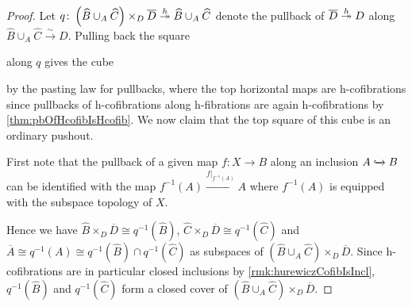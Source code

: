 \begin{prop}
\begin{proof}
        Let $q\colon\left(\widehat{B}\cup_A\widehat{C}\right)\times_{D}\overline{D}\xtwoheadrightarrow{h}\widehat{B}\cup_A\widehat{C}$ denote the pullback of $\overline{D}\xtwoheadrightarrow{h} D$ along $\widehat{B}\cup_A\widehat{C}\xrightarrow{\sim} D$.
        Pulling back the square 
        \begin{center}
        \end{center}
        along $q$ gives the cube
        \begin{center}
        \end{center}
        by the pasting law for pullbacks, where the top horizontal maps are h-cofibrations since pullbacks of h-cofibrations along h-fibrations are again h-cofibrations by \cref{thm:pbOfHcofibIsHcofib}.
        We now claim that the top square of this cube is an ordinary pushout.

        First note that the pullback of a given map $f\colon X\to B$ along an inclusion $A\xhookrightarrow{} B$ can be identified with the map $f^{-1}(A)\xrightarrow{f|_{f^{-1}(A)}}A$ where $f^{-1}(A)$ is equipped with the subspace topology of $X$. 
        
        Hence we have $\widehat{B}\times_{D}\overline{D}\cong q^{-1}(\widehat{B})$, $\widehat{C}\times_{D}\overline{D}\cong q^{-1}(\widehat{C})$ and $\overline{A}\cong q^{-1}(A)\cong q^{-1}(\widehat{B})\cap q^{-1}(\widehat{C})$ as subspaces of $\left(\widehat{B}\cup_A\widehat{C}\right)\times_{D}\overline{D}$.
        Since h-cofibrations are in particular closed inclusions by \cref{rmk:hurewiczCofibIsIncl}, $q^{-1}(\widehat{B})$ and $q^{-1}(\widehat{C})$ form a closed cover of $\left(\widehat{B}\cup_A\widehat{C}\right)\times_{D}\overline{D}$.
        

\end{proof}
\end{prop}
